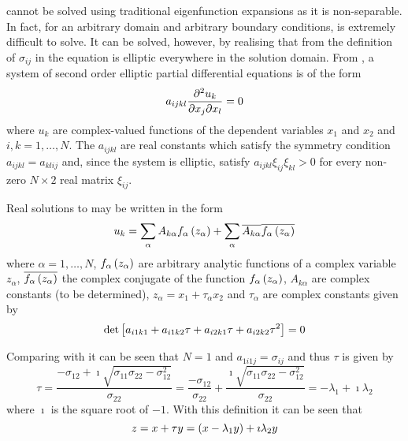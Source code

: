  cannot be solved using traditional eigenfunction
expansions as it is non-separable. In fact, for an arbitrary domain and
arbitrary boundary conditions,  is extremely
difficult to solve. It can be solved, however, by realising that from the
definition of $\sigma_{ij}$ in  the
equation is elliptic everywhere in the solution domain. From
\citet{clements:1981}, a system of second order elliptic partial
differential equations is of the form
\begin{equation}
  a_{ijkl}\deltwoby{u_{k}}{x_{j}}{x_{l}}=0
  \label{eqn:general2ndorderellipticpde}
\end{equation}
where $u_{k}$ are complex-valued functions of the dependent variables
$x_{1}$ and $x_{2}$ and $i,k=1,\ldots,N$. The $a_{ijkl}$ are real constants
which satisfy the symmetry condition $a_{ijkl}=a_{klij}$ and, since the system
is elliptic, satisfy $a_{ijkl}\xi_{ij}\xi_{kl}>0$ for every non-zero $N\times
2$ real matrix $\xi_{ij}$.

Real solutions to  may be written in
the form 
\begin{equation}
  u_{k}= \displaystyle\sum _{\alpha}A_{k\alpha} f_{\alpha}\left( z_{\alpha} \right) +
   \displaystyle\sum _{\alpha}\overline{A_{k\alpha}}\overline{ f_{\alpha}\left( z_{\alpha} \right) }
\end{equation}
where $\alpha=1,\hdots,N$, $ f_{\alpha}\left( z_{\alpha} \right) $ are arbitrary
analytic functions of a complex variable $z_{\alpha}$,
$\overline{ f_{\alpha}\left( z_{\alpha} \right) }$ the complex conjugate of the
function $ f_{\alpha}\left( z_{\alpha} \right) $, $A_{k\alpha}$ are complex constants
(to be determined), $z_{\alpha}=x_{1}+\tau_{\alpha} x_{2}$ and $\tau_{\alpha}$
are complex constants given by
\begin{equation}
  \det\left[ a_{i1k1}+a_{i1k2}\tau+a_{i2k1}\tau+a_{i2k2}\tau^{2} \right]=0
\end{equation}

Comparing  with
 it can be seen that $N=1$ and
$a_{1i1j}=\sigma_{ij}$ and thus $\tau$ is given by
\begin{equation}
  \tau=\dfrac{-\sigma_{12}+\imath\sqrt{\sigma_{11}\sigma_{22}-\sigma_{12}^{2}}}
  {\sigma_{22}}=\dfrac{-\sigma_{12}}{\sigma_{22}}+\dfrac{\imath\sqrt{
      \sigma_{11}\sigma_{22}-\sigma_{12}^{2}}}{\sigma_{22}}=-\lambda_{1}+
  \imath\lambda_{2}
\end{equation}
where $\imath$ is the square root of $-1$. With this definition it can be seen
that
\begin{equation}
  z=x+\tau y=\left( x-\lambda_{1}y \right)+\imath\lambda_{2}y
\end{equation}

